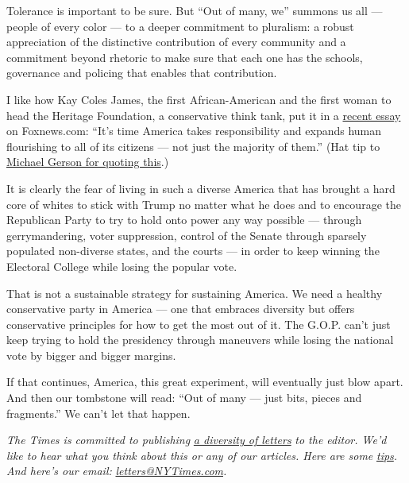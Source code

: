 Tolerance is important to be sure. But ``Out of many, we'' summons us
all --- people of every color --- to a deeper commitment to pluralism: a
robust appreciation of the distinctive contribution of every community
and a commitment beyond rhetoric to make sure that each one has the
schools, governance and policing that enables that contribution.

I like how Kay Coles James, the first African-American and the first
woman to head the Heritage Foundation, a conservative think tank, put it
in a
\href{https://www.foxnews.com/opinion/george-floyds-senseless-killing-end-racism-americas-cancer-kay-coles-james}{recent
essay} on Foxnews.com: ``It's time America takes responsibility and
expands human flourishing to all of its citizens --- not just the
majority of them.'' (Hat tip to
\href{https://www.washingtonpost.com/opinions/this-is-what-happens-when-bigotry-dominates-the-main-conservative-media-platform/2020/06/08/c1deaf50-a9ba-11ea-a9d9-a81c1a491c52_story.html}{Michael
Gerson for quoting this}.)

It is clearly the fear of living in such a diverse America that has
brought a hard core of whites to stick with Trump no matter what he does
and to encourage the Republican Party to try to hold onto power any way
possible --- through gerrymandering, voter suppression, control of the
Senate through sparsely populated non-diverse states, and the courts ---
in order to keep winning the Electoral College while losing the popular
vote.

That is not a sustainable strategy for sustaining America. We need a
healthy conservative party in America --- one that embraces diversity
but offers conservative principles for how to get the most out of it.
The G.O.P. can't just keep trying to hold the presidency through
maneuvers while losing the national vote by bigger and bigger margins.

If that continues, America, this great experiment, will eventually just
blow apart. And then our tombstone will read: ``Out of many --- just
bits, pieces and fragments.'' We can't let that happen.

\emph{The Times is committed to publishing}
\href{https://www.nytimes3xbfgragh.onion/2019/01/31/opinion/letters/letters-to-editor-new-york-times-women.html}{\emph{a
diversity of letters}} \emph{to the editor. We'd like to hear what you
think about this or any of our articles. Here are some}
\href{https://help.nytimes3xbfgragh.onion/hc/en-us/articles/115014925288-How-to-submit-a-letter-to-the-editor}{\emph{tips}}\emph{.
And here's our email:}
\href{mailto:letters@NYTimes.com}{\emph{letters@NYTimes.com}}\emph{.}

